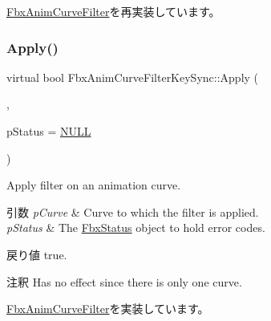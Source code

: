 \hyperlink{class_fbx_anim_curve_filter_aca6a41fbc4d9019b20df7adccfa6ed3c}{Fbx\+Anim\+Curve\+Filter}を再実装しています。

\mbox{\label{class_fbx_anim_curve_filter_key_sync_acc77ba686024c5f204e9e78e52dc15f5}} 
\subsubsection{\texorpdfstring{Apply()}{Apply()}\hspace{0.1cm}{\footnotesize\ttfamily [5/5]}}
{\footnotesize\ttfamily virtual bool Fbx\+Anim\+Curve\+Filter\+Key\+Sync\+::\+Apply (\begin{DoxyParamCaption}\item[{\hyperlink{class_fbx_anim_curve}{Fbx\+Anim\+Curve} \&}]{,  }\item[{\hyperlink{class_fbx_status}{Fbx\+Status} $\ast$}]{p\+Status = {\ttfamily \hyperlink{fbxarch_8h_a070d2ce7b6bb7e5c05602aa8c308d0c4}{N\+U\+LL}} }\end{DoxyParamCaption})\hspace{0.3cm}{\ttfamily [virtual]}}

Apply filter on an animation curve. 
\begin{DoxyParams}{引数}
{\em p\+Curve} & Curve to which the filter is applied. \\
\hline
{\em p\+Status} & The \hyperlink{class_fbx_status}{Fbx\+Status} object to hold error codes. \\
\hline
\end{DoxyParams}
\begin{DoxyReturn}{戻り値}
{\ttfamily true}. 
\end{DoxyReturn}
\begin{DoxyRemark}{注釈}
Has no effect since there is only one curve. 
\end{DoxyRemark}


\hyperlink{class_fbx_anim_curve_filter_a6a69996c47c0e6f63a0f8b0d5fa806a0}{Fbx\+Anim\+Curve\+Filter}を実装しています。

\mbox{\label{class_fbx_anim_curve_filter_key_sync_acf561aadd8d5f4b35826044c6d50b6b4}} 
